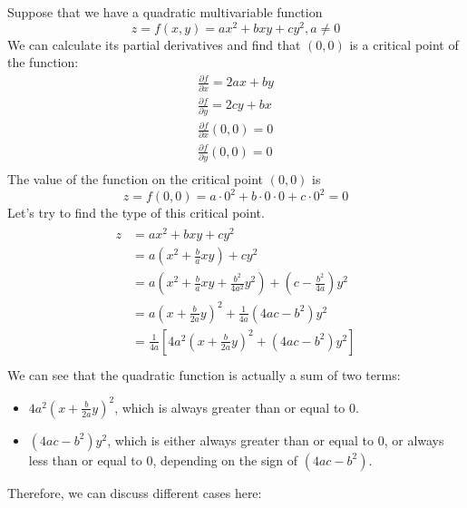 \documentclass{article}
\begin{document}
Suppose that we have a quadratic multivariable function 
\begin{equation*}
  z = f(x, y) = ax^2 + bxy + cy^2, a \neq 0
\end{equation*}
We can calculate its partial derivatives and find that $(0, 0)$ is a critical 
point of the function:
\begin{gather*}
  \frac{\partial f}{\partial x} = 2ax + by \\
  \frac{\partial f}{\partial y} = 2cy + bx \\
  \frac{\partial f}{\partial x}(0, 0) = 0 \\
  \frac{\partial f}{\partial y}(0, 0) = 0 \\
\end{gather*}
The value of the function on the critical point $(0, 0)$ is 
\begin{equation*}
  z = f(0, 0) = a \cdot 0^2 + b \cdot 0 \cdot 0 + c \cdot 0^2 = 0
\end{equation*}
Let's try to find the type of this critical point.
\begin{gather*}
  \begin{split}
    z &= ax^2 + bxy + cy^2 \\
      &= a(x^2 + \frac{b}{a}xy) + cy^2 \\
      &= a(x^2 + \frac{b}{a}xy + \frac{b^2}{4a^2}y^2) + (c - \frac{b^2}{4a})y^2 \\
      &= a(x + \frac{b}{2a}y)^2 + \frac{1}{4a}(4ac - b^2)y^2 \\
      &= \frac{1}{4a}[4a^2(x + \frac{b}{2a}y)^2 + (4ac - b^2)y^2] \\
  \end{split}
\end{gather*}
We can see that the quadratic function is actually a sum of two terms:
\begin{itemize}
  \item $4a^2(x + \frac{b}{2a}y)^2$, which is always greater than or equal to 0.
  \item $(4ac - b^2)y^2$, which is either always greater than or equal to 0, or 
    always less than or equal to 0, depending on the sign of $(4ac - b^2)$.
\end{itemize}
Therefore, we can discuss different cases here:
\end{document}
